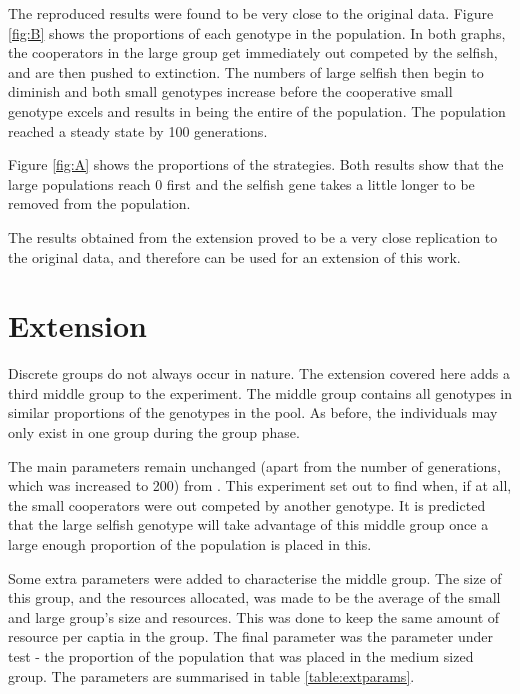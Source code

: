 \documentclass[11pt]{ecsarticle}
\begin{document}
The reproduced results were found to be very close to the original data. 
Figure \ref{fig:B} shows the proportions of each genotype in the population.
In both graphs, the cooperators in the large group get immediately out competed by the selfish, and are then pushed to extinction.
The numbers of large selfish then begin to diminish and both small genotypes increase before the cooperative small genotype excels and results in being the entire of the population.
The population reached a steady state by 100 generations.

Figure \ref{fig:A} shows the proportions of the strategies. 
Both results show that the large populations reach 0 first and the selfish gene takes a little longer to be removed from the population.

The results obtained from the extension proved to be a very close replication to the original data, and therefore can be used for an extension of this work.

\section{Extension}\label{sc:extension}

Discrete groups do not always occur in nature.
The extension covered here adds a third middle group to the experiment. 
The middle group contains all genotypes in similar proportions of the genotypes in the pool.
As before, the individuals may only exist in one group during the group phase. 

The main parameters remain unchanged (apart from the number of generations, which was increased to 200) from \cite{powers2007individual}.
This experiment set out to find when, if at all, the small cooperators were out competed by another genotype.
It is predicted that the large selfish genotype will take advantage of this middle group once a large enough proportion of the population is placed in this.


Some extra parameters were added to characterise the middle group. 
The size of this group, and the resources allocated, was made to be the average of the small and large group's size and resources. 
This was done to keep the same amount of resource per captia in the group.
The final parameter was the parameter under test - the proportion of the population that was placed in the medium sized group.
The parameters are summarised in table \ref{table:extparams}. 
\end{document}
